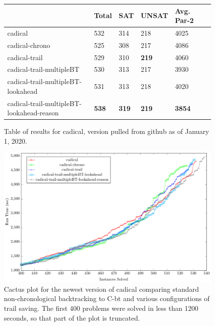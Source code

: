 \documentclass[runningheads]{llncs}
\newcommand{\cbt}{C-bt\xspace}
\begin{document}
\begin{figure}[H]
\centering
    \begin{tabular}{|l|l|l|l|l|l|}
      \hline
      & Total & SAT & UNSAT & Avg. Par-2 \\ \hline
      cadical                  & 532          & 314 &  218  & 4025                             \\ \hline
      cadical-chrono          & 525          & 308 &  217  & 4086                             \\ \hline
      cadical-trail           & 529          & 310 &  \textbf{219}  & 4060                   \\ \hline
      cadical-trail-multipleBT & 530 & 313 & 217 & 3930 \\ \hline
      cadical-trail-multipleBT-lookahead & 531          & 313 &  218  & 4020                      \\ \hline
      cadical-trail-multipleBT-lookahead-reason & \textbf{538} & \textbf{319} & \textbf{219} & \textbf{3854} \\ \hline
    \end{tabular}
    \caption{Table of results for cadical, version pulled from github as of January 1, 2020.}
    \label{fig:cadicalNew}
\end{figure}

\begin{figure}\centering\includegraphics[scale=0.65]{figures/cactus_cadical_new.pdf}\caption{\small{Cactus plot for the newest version of cadical comparing standard non-chronological backtracking to \cbt and various configurations of trail saving. The first 400 problems were solved in less than 1200 seconds, so that part of the plot is truncated.}}\label{fig:cactus_cadical}\end{figure}
\end{document}
